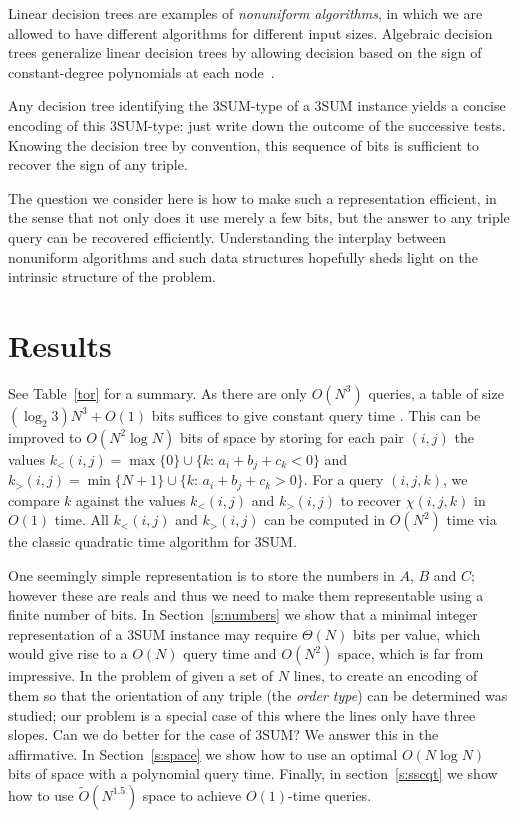 Linear decision trees are examples of {\em nonuniform algorithms}, in which we
are allowed to have different algorithms for different input sizes.
Algebraic decision trees generalize linear decision trees
by allowing decision based on the sign of constant-degree polynomials at each
node~\cite{SY82}.

Any decision tree identifying the 3SUM-type of a 3SUM instance yields a concise
encoding of this 3SUM-type:
just write down the outcome of the successive tests. Knowing the decision tree
by convention, this sequence of bits is
sufficient to recover the sign of any triple.

The question we consider here is how to make such a representation efficient,
in the sense that not only does it use merely a few bits, but the answer to any
triple query can be recovered efficiently. Understanding the interplay between
nonuniform algorithms and such data structures hopefully sheds light on the
intrinsic structure of the problem.

\section{Results}

See Table~\ref{tor} for a summary. As there are only $O(N^3)$ queries, a table
of size $(\log_2 3) N^3 + O(1)$ bits suffices to give constant query time
\cite{DPT10}. This can be improved to $O(N^2\log N)$ bits of space by 
storing for each pair $(i,j)$ the values
\(k_<(i,j) = \max \{ 0\}\cup \{k \colon\, a_i + b_j + c_k < 0\}\) and
\(k_>(i,j) = \min \{ N+1\}\cup \{k \colon\, a_i + b_j + c_k > 0\}\).
For a query \((i,j,k)\), we compare \(k\) against the values \(k_<(i,j)\) and \(k_>(i,j)\)
to recover \(\chi(i,j,k)\) in \(O(1)\) time. All \(k_<(i,j)\) and \(k_>(i,j)\)
can be computed in \(O(N^2)\) time via the classic quadratic time algorithm for
3SUM.

One seemingly simple representation is to store the numbers in $A$, $B$ and
$C$; however these are reals and thus we need to make them representable using
a finite number of bits.
In Section~\ref{s:numbers} we show that a minimal integer representation of a
3SUM instance may require $\Theta(N)$ bits per value, which would give
rise to a $O(N)$ query time and $O(N^2)$ space, which is far from
impressive.
In \cite{CCILO18} the problem of given a set of $N$ lines, to create an
encoding of them so that the orientation of any triple (the \emph{order type})
can be determined was studied; our problem is a special case of this where the
lines only have three slopes.
Can we do better for the case of 3SUM? We answer this in the affirmative.
In Section~\ref{s:space} we show how to use an optimal $O(N \log N)$ bits of
space with a polynomial query time. Finally, in section~\ref{s:sscqt} we show
how to use $\tilde{O}(N^{1.5})$ space to achieve $O(1)$-time queries.

